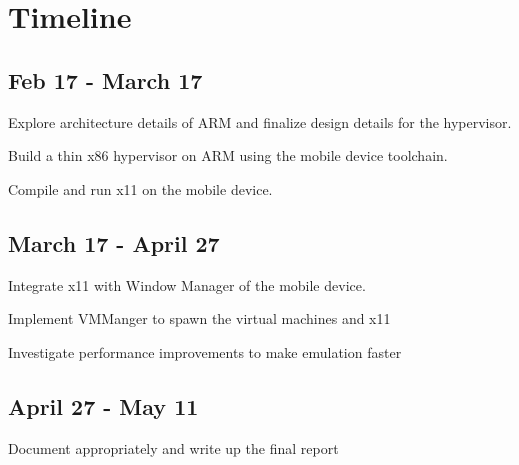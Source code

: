 \section{Timeline}
\subsection{Feb 17 - March 17}
	\begin{itemize*}
	\item Explore architecture details of ARM and finalize design details for the hypervisor.
	\item Build a thin x86 hypervisor on ARM using the mobile device toolchain.
	\item Compile and run x11 on the mobile device.
	\end{itemize*}
\subsection{March 17 - April 27}
	\begin{itemize*}
	\item Integrate x11 with Window Manager of the mobile device.
	\item Implement VMManger to spawn the virtual machines and x11 
	\item Investigate performance improvements to make emulation faster
	\end{itemize*}
\subsection{April 27 - May 11}
	\begin{itemize*}
	\item Document appropriately and write up the final report 
	\end{itemize*}
